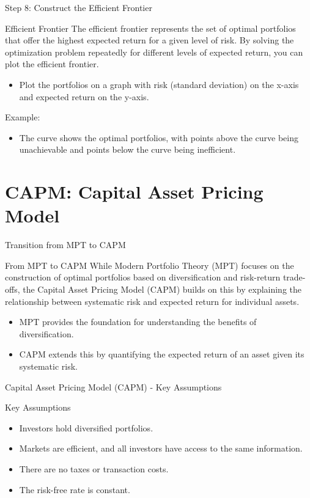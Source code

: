 \documentclass{beamer}
\begin{document}
\begin{frame}{Step 8: Construct the Efficient Frontier}
  \begin{block}{Efficient Frontier}
    The efficient frontier represents the set of optimal portfolios that offer the highest expected return for a given level of risk. By solving the optimization problem repeatedly for different levels of expected return, you can plot the efficient frontier.
    \begin{itemize}
      \item Plot the portfolios on a graph with risk (standard deviation) on the x-axis and expected return on the y-axis.
    \end{itemize}
    Example:
    \begin{itemize}
      \item The curve shows the optimal portfolios, with points above the curve being unachievable and points below the curve being inefficient.
    \end{itemize}
  \end{block}
\end{frame}

\section{CAPM: Capital Asset Pricing Model}
\begin{frame}{Transition from MPT to CAPM}
  \begin{block}{From MPT to CAPM}
    While Modern Portfolio Theory (MPT) focuses on the construction of optimal portfolios based on diversification and risk-return trade-offs, the Capital Asset Pricing Model (CAPM) builds on this by explaining the relationship between systematic risk and expected return for individual assets.
    \begin{itemize}
      \item MPT provides the foundation for understanding the benefits of diversification.
      \item CAPM extends this by quantifying the expected return of an asset given its systematic risk.
    \end{itemize}
  \end{block}
\end{frame}

\begin{frame}{Capital Asset Pricing Model (CAPM) - Key Assumptions}
  \begin{block}{Key Assumptions}
    \begin{itemize}
      \item Investors hold diversified portfolios.
      \item Markets are efficient, and all investors have access to the same information.
      \item There are no taxes or transaction costs.
      \item The risk-free rate is constant.
    \end{itemize}
  \end{block}
\end{frame}
\end{document}
